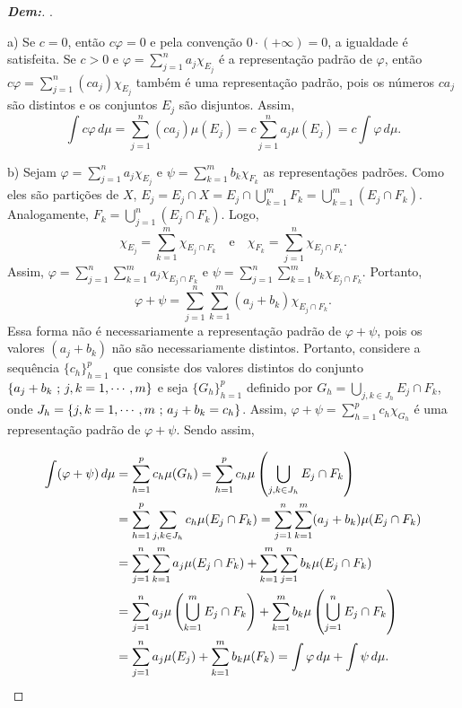 \begin{proof}[\textbf{Dem:}]. 

\noindent
a) Se $c = 0$, então $c\varphi = 0$ e pela convenção $0 \cdot (+\infty) = 0$, a igualdade é satisfeita. Se $c > 0$ e $\varphi = \sum_{j=1}^n a_j \chi_{E_j}$ é a representação padrão de $\varphi$, então $c\varphi = \sum_{j=1}^n (ca_j) \chi_{E_j}$ também é uma representação padrão, pois os números $ca_j$ são distintos e os conjuntos $E_j$ são disjuntos. Assim,
$$ \int c\varphi \, d\mu = \sum_{j=1}^n (ca_j) \mu(E_j) = c \sum_{j=1}^n a_j \mu(E_j) = c \int \varphi \, d\mu. $$

\noindent
b) Sejam $\varphi = \sum_{j=1}^n a_j \chi_{E_j}$ e $\psi = \sum_{k=1}^m b_k \chi_{F_k}$ as representações padrões. Como eles são partições de $X$, $E_j = E_j \cap X = E_j \cap \bigcup_{k=1}^m F_k = \bigcup_{k=1}^m (E_j \cap F_k)$. Analogamente, $F_k = \bigcup_{j=1}^n (E_j \cap F_k)$. Logo,
$$ \chi_{E_j} = \sum_{k=1}^m \chi_{E_j \cap F_k} \quad \text{e} \quad \chi_{F_k} = \sum_{j=1}^n \chi_{E_j \cap F_k}. $$
Assim, $\varphi = \sum_{j=1}^n \sum_{k=1}^m a_j \chi_{E_j \cap F_k}$ e $\psi = \sum_{j=1}^n \sum_{k=1}^m b_k \chi_{E_j \cap F_k}$. Portanto,
$$ \varphi + \psi = \sum_{j=1}^n \sum_{k=1}^m (a_j + b_k) \chi_{E_j \cap F_k}. $$
  Essa forma não é necessariamente a representação padrão de $\varphi + \psi$, 
  pois os valores $(a_j + b_k)$ não são necessariamente distintos.
  Portanto, considere a sequência $\{c_h\}_{h=1}^p$ que consiste dos valores distintos 
  do conjunto $\{a_j + b_k \text{ ; } j, k = 1, \cdots, m\}$ e seja $\{G_h\}_{h=1}^p$ definido por 
  $G_h = \bigcup\limits_{j, k \in J_h} E_j \cap F_k$, onde $J_h = \{j,k = 1, \cdots, m \text{ ; } 
  a_j + b_k = c_h\}$. Assim, $\varphi + \psi = \sum_{h= 1}^p c_h \chi_{G_h}$ 
  é uma representação padrão de $\varphi + \psi$. Sendo assim,

\begin{align*}
  \int (\varphi + \psi) \, d\mu &= \sum_{h=1}^p c_h \mu(G_h) =
    \sum_{h=1}^p c_h \mu\left(\bigcup_{j, k \in J_h} E_j \cap F_k\right) \\
    &= \sum_{h=1}^p  \sum_{j, k \in J_h} c_h \mu(E_j \cap F_k)=
    \sum_{j=1}^n \sum_{k=1}^m (a_j + b_k) \mu(E_j \cap F_k) \\
    &= \sum_{j=1}^n \sum_{k=1}^m a_j \mu(E_j \cap F_k) + \sum_{k=1}^m \sum_{j=1}^n b_k \mu(E_j \cap F_k) \\
    &= \sum_{j=1}^n a_j \mu\left(\bigcup_{k=1}^m E_j \cap F_k\right) + \sum_{k=1}^m b_k \mu\left(\bigcup_{j=1}^n E_j \cap F_k\right) \\
    &= \sum_{j=1}^n a_j \mu(E_j) + \sum_{k=1}^m b_k \mu(F_k) = \int \varphi \, d\mu + \int \psi \, d\mu.
\end{align*}


\end{proof}
